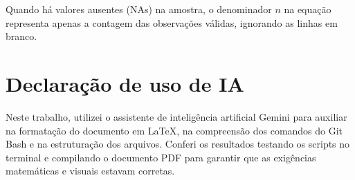 \documentclass{article}
\begin{document}
Quando há valores ausentes (NAs) na amostra, o denominador $n$ na equação representa apenas a contagem das observações válidas, ignorando as linhas em branco.

\section*{Declaração de uso de IA}
Neste trabalho, utilizei o assistente de inteligência artificial Gemini para auxiliar na formatação do documento em LaTeX, na compreensão dos comandos do Git Bash e na estruturação dos arquivos. Conferi os resultados testando os scripts no terminal e compilando o documento PDF para garantir que as exigências matemáticas e visuais estavam corretas.



\end{document}

